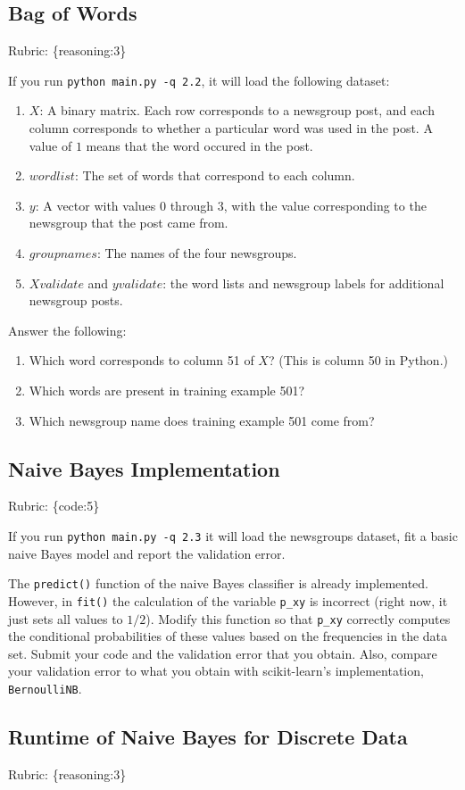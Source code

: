 \documentclass{article}
\def\rubric#1{\gre{Rubric: \{#1\}}}{}
\def\blu#1{{\color{blu}#1}}
\def\gre#1{{\color{gre}#1}}
\def\enum#1{\begin{enumerate}#1\end{enumerate}}
\begin{document}
\subsection{Bag of Words}
\rubric{reasoning:3}

If you run \texttt{python main.py -q 2.2}, it will load the following dataset:
\enum{
\item $X$: A binary matrix. Each row corresponds to a newsgroup post, and each column corresponds to whether a particular word was used in the post. A value of $1$ means that the word occured in the post.
\item $wordlist$: The set of words that correspond to each column.
\item $y$: A vector with values $0$ through $3$, with the value corresponding to the newsgroup that the post came from.
\item $groupnames$: The names of the four newsgroups.
\item $Xvalidate$ and $yvalidate$: the word lists and newsgroup labels for additional newsgroup posts.
}
\blu{Answer the following}:
\enum{
\item Which word corresponds to column 51 of $X$? (This is column 50 in Python.)
\item Which words are present in training example 501?
\item Which newsgroup name does training example 501 come from?
}

\subsection{Naive Bayes Implementation}
\rubric{code:5}

If you run \texttt{python main.py -q 2.3}
it will load the newsgroups dataset, fit a basic naive Bayes model and report the validation error.

The \texttt{predict()} function of the naive Bayes classifier is already implemented.
However, in \texttt{fit()}
the calculation of the variable \texttt{p\_xy} is incorrect
(right now, it just sets all values to $1/2$).
\blu{Modify this function so that \texttt{p\_xy} correctly
computes the conditional probabilities of these values based on the
frequencies in the data set. Submit your code and the validation error that you obtain.
Also, compare your validation error to what you obtain with scikit-learn's implementation, \texttt{BernoulliNB}.}


\subsection{Runtime of Naive Bayes for Discrete Data}
\rubric{reasoning:3}
\end{document}
